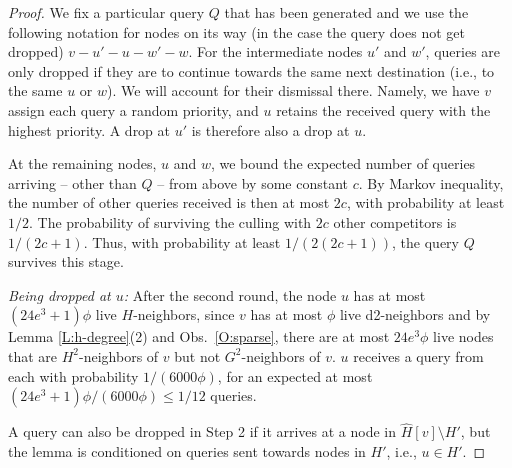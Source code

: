 \begin{proof}
We fix a particular query $Q$ that has been generated and we use the following notation for nodes on its way (in the case the query does not get dropped) $v-u'-u-w'-w$.
For the intermediate nodes $u'$ and $w'$, queries are only dropped if they are to continue towards the same next destination (i.e., to the same $u$ or $w$). We will account for their dismissal there. Namely, we have $v$  assign each query a random priority, and $u$ retains the received query with the highest priority. A drop at $u'$ is therefore also a drop at $u$.

At the remaining nodes, $u$ and $w$, we bound the expected number of queries arriving -- other than $Q$ -- from above by some constant $c$. By Markov inequality, the number of other queries received is then at most $2c$, with probability at least $1/2$. The probability of surviving the culling with $2c$ other competitors is $1/(2c+1)$. 
Thus, with probability at least $1/(2(2c+1))$, the query $Q$ survives this stage.


\textit{Being dropped at $u$:} After the second round, the node $u$ has at most $(24e^3+1)\phi$ live $H$-neighbors, since $v$ has at most $\phi$ live d2-neighbors and by Lemma \ref{L:h-degree}(2) and Obs.~\ref{O:sparse}, 
there are at most $24e^3\phi$ live nodes that are $H^2$-neighbors of $v$ but not $G^2$-neighbors of $v$. $u$ receives a query from each with probability $1/(6000\phi)$, for an expected at most $(24e^3+1)\phi/(6000\phi) \le 1/12$ queries.

A query can also be dropped in Step 2 if it arrives at a node in $\hat{H}[v] \setminus H'$, but the lemma is conditioned on queries sent towards nodes in $H'$, i.e., $u\in H'$. 



\end{proof}
